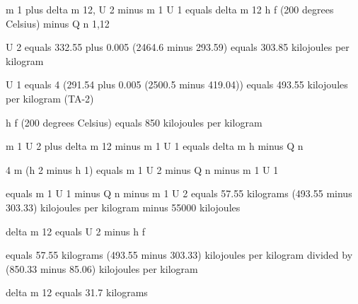 m 1 plus delta m 12, U 2 minus m 1 U 1 equals delta m 12 h f (200 degrees Celsius) minus Q n 1,12

U 2 equals 332.55 plus 0.005 (2464.6 minus 293.59) equals 303.85 kilojoules per kilogram

U 1 equals 4 (291.54 plus 0.005 (2500.5 minus 419.04)) equals 493.55 kilojoules per kilogram (TA-2)

h f (200 degrees Celsius) equals 850 kilojoules per kilogram

m 1 U 2 plus delta m 12 minus m 1 U 1 equals delta m h minus Q n

4 m (h 2 minus h 1) equals m 1 U 2 minus Q n minus m 1 U 1

equals m 1 U 1 minus Q n minus m 1 U 2 equals 57.55 kilograms (493.55 minus 303.33) kilojoules per kilogram minus 55000 kilojoules

delta m 12 equals U 2 minus h f

equals 57.55 kilograms (493.55 minus 303.33) kilojoules per kilogram divided by (850.33 minus 85.06) kilojoules per kilogram

delta m 12 equals 31.7 kilograms